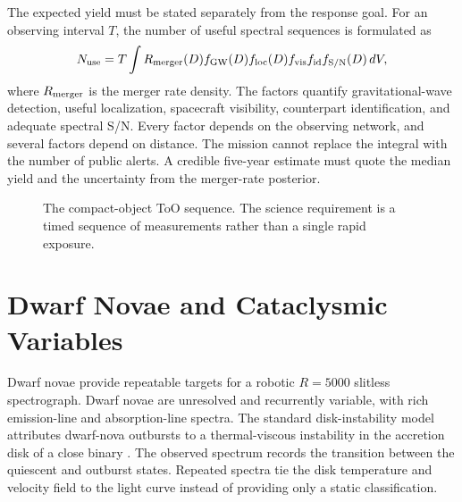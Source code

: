 \documentclass[10pt,onecolumn]{article}
\begin{document}
The expected yield must be stated separately from the response goal. For an
observing interval $T$, the number of useful spectral sequences is formulated
as
\begin{equation}
 N_{\rm use}=T\int R_{\rm merger}(D)
 f_{\rm GW}(D)f_{\rm loc}(D)f_{\rm vis}
 f_{\rm id}f_{\rm S/N}(D)\,dV ,
 \label{eq:kilonova_yield}
\end{equation}
where $R_{\rm merger}$ is the merger rate density. The factors quantify
gravitational-wave detection, useful localization, spacecraft visibility,
counterpart identification, and adequate spectral S/N. Every factor depends
on the observing network, and several factors depend on distance. The mission
cannot replace the integral with the number of public alerts. A credible
five-year estimate must quote the median yield and the uncertainty from the
merger-rate posterior.

\begin{figure}[H]
\centering
{}
\caption{The compact-object ToO sequence. The science requirement is a timed
sequence of measurements rather than a single rapid exposure.}
\label{fig:too_timeline}
\end{figure}

\section{Dwarf Novae and Cataclysmic Variables}

Dwarf novae provide repeatable targets for a robotic $R=5000$ slitless
spectrograph. Dwarf novae are unresolved and recurrently variable, with rich
emission-line and absorption-line spectra. The standard disk-instability model
attributes dwarf-nova outbursts to a thermal-viscous instability in the
accretion disk of a close binary
\cite{warner1995,lasota2001}. The observed spectrum records the transition
between the quiescent and outburst states. Repeated spectra tie the disk
temperature and velocity field to the light curve instead of providing only a
static classification.
\end{document}
